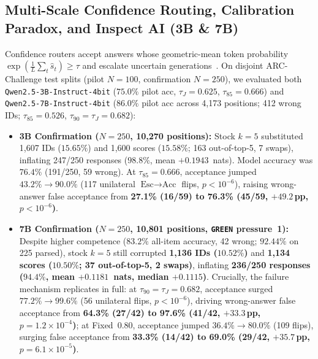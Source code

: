 \documentclass[11pt,letterpaper]{article}
\begin{document}
\subsection{Multi-Scale Confidence Routing, Calibration Paradox, and Inspect AI (3B \& 7B)}
Confidence routers accept answers whose geometric-mean token probability $\exp(\frac{1}{L}\sum_t \hat{s}_t) \ge \tau$ and escalate uncertain generations~\cite{geifman2017selective,omlxuser}. On disjoint ARC-Challenge test splits (pilot $N=100$, confirmation $N=250$), we evaluated both \texttt{Qwen2.5-3B-Instruct-4bit} ($75.0\%$ pilot acc, $\tau_J=0.625$, $\tau_{85}=0.666$) and \texttt{Qwen2.5-7B-Instruct-4bit} ($86.0\%$ pilot acc across 4,173 positions; 412 wrong IDs; $\tau_{85}=0.526$, $\tau_{90}=\tau_J=0.682$):
\begin{itemize}
\item \textbf{3B Confirmation ($N=250$, 10,270 positions):} Stock $k=5$ substituted 1,607 IDs ($15.65\%$) and 1,600 scores ($15.58\%$; 163 out-of-top-5, 7 swaps), inflating 247/250 responses ($98.8\%$, mean $+0.1943$~nats). Model accuracy was $76.4\%$ (191/250, 59 wrong). At $\tau_{85}=0.666$, acceptance jumped $43.2\% \to 90.0\%$ (117 unilateral $\text{Esc}\to\text{Acc}$ flips, $p<10^{-6}$), raising wrong-answer false acceptance from \textbf{27.1\% (16/59) to 76.3\% (45/59, $+49.2$\,pp, $p<10^{-6}$)}.
\item \textbf{7B Confirmation ($N=250$, 10,801 positions, \texttt{GREEN} pressure~1):} Despite higher competence ($83.2\%$ all-item accuracy, 42 wrong; $92.44\%$ on 225 parsed), stock $k=5$ still corrupted \textbf{1,136 IDs ($10.52\%$)} and \textbf{1,134 scores ($10.50\%$; 37 out-of-top-5, 2 swaps)}, inflating \textbf{236/250 responses ($94.4\%$, mean $+0.1181$~nats, median $+0.1115$)}. Crucially, the failure mechanism replicates in full: at $\tau_{90}=\tau_J=0.682$, acceptance surged $77.2\% \to 99.6\%$ (56 unilateral flips, $p<10^{-6}$), driving wrong-answer false acceptance from \textbf{64.3\% (27/42) to 97.6\% (41/42, $+33.3$\,pp, $p=1.2\times 10^{-4}$)}; at Fixed~0.80, acceptance jumped $36.4\% \to 80.0\%$ (109 flips), surging false acceptance from \textbf{33.3\% (14/42) to 69.0\% (29/42, $+35.7$\,pp, $p=6.1\times 10^{-5}$)}.
\end{itemize}
\end{document}
